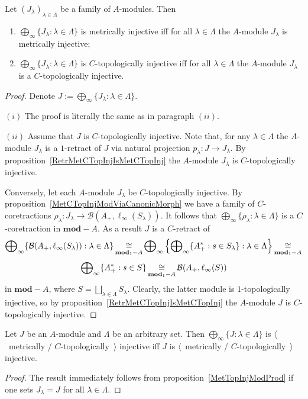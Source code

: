 \begin{proposition}\label{MetTopInjModProd} Let
${(J_\lambda)}_{\lambda\in\Lambda}$ be a family of $A$-modules. Then 

\begin{enumerate}[label = (\roman*)]
    \item $\bigoplus_\infty \{J_\lambda:\lambda\in\Lambda \}$ is metrically
    injective iff for all $\lambda\in\Lambda$ the $A$-module $J_\lambda$ is
    metrically injective;

    \item $\bigoplus_\infty \{J_\lambda:\lambda\in\Lambda \}$ is
    $C$-topologically injective iff for all $\lambda\in\Lambda$ the $A$-module
    $J_\lambda$ is a $C$-topologically injective.
\end{enumerate}
\end{proposition}
\begin{proof} Denote $J:=\bigoplus_\infty \{J_\lambda:\lambda\in\Lambda \}$.

$(i)$ The proof is literally the same as in paragraph $(ii)$.

$(ii)$ Assume that $J$ is $C$-topologically injective. Note that, for any
$\lambda\in\Lambda$ the $A$-module $J_\lambda$ is a $1$-retract of $J$ via
natural projection $p_\lambda:J\to J_\lambda$. By
proposition~\ref{RetrMetCTopInjIsMetCTopInj} the $A$-module $J_\lambda$ is
$C$-topologically injective.

Conversely, let each $A$-module $J_\lambda$ be $C$-topologically injective. By
proposition~\ref{MetCTopInjModViaCanonicMorph} we have a family of
$C$-coretractions
$\rho_\lambda:J_\lambda\to\mathcal{B}(A_+,\ell_\infty(S_\lambda))$. It follows
that $\bigoplus_\infty \{\rho_\lambda:\lambda\in\Lambda \}$ is a
$C$-coretraction in $\mathbf{mod}-A$. As a result $J$ is a $C$-retract of 
$$
\bigoplus\nolimits_\infty \{
    \mathcal{B}(A_+,\ell_\infty(S_\lambda)):\lambda\in\Lambda
 \}
\mathop{\mathbin{\cong}}\limits_{\mathbf{mod}_1-A}
\bigoplus\nolimits_\infty\left \{
    \bigoplus\nolimits_\infty \{ A_+^*:s\in S_\lambda \}:\lambda\in\Lambda
\right \}
\mathop{\mathbin{\cong}}\limits_{\mathbf{mod}_1-A}
$$
$$
\bigoplus\nolimits_\infty \{A_+^*:s\in S \}
\mathop{\mathbin{\cong}}\limits_{\mathbf{mod}_1-A}
\mathcal{B}(A_+,\ell_\infty(S))
$$
in $\mathbf{mod}-A$, where $S=\bigsqcup_{\lambda\in\Lambda}S_\lambda$. Clearly,
the latter module is $1$-topologically injective, so by
proposition~\ref{RetrMetCTopInjIsMetCTopInj} the $A$-module $J$ is $C$-topologically
injective.
\end{proof}

\begin{corollary}\label{MetTopInjlInftySum} Let $J$ be an $A$-module and
$\Lambda$ be an arbitrary set. Then $\bigoplus_\infty \{J:\lambda\in\Lambda \}$
is $\langle$~metrically / $C$-topologically~$\rangle$ injective iff $J$ is
$\langle$~metrically / $C$-topologically~$\rangle$ injective.
\end{corollary}
\begin{proof} The result immediately follows from
proposition~\ref{MetTopInjModProd} if one sets $J_\lambda=J$ 
for all $\lambda\in\Lambda$.
\end{proof}

